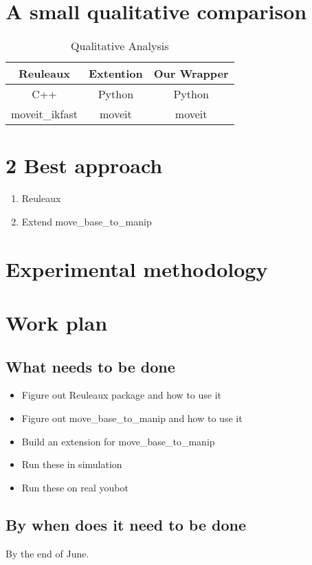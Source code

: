 \documentclass[12pt]{article}
\begin{document}
\section{A small qualitative comparison}
\begin{table}[htpb]
        \centering
        \caption{Qualitative Analysis}
        \label{tab:qualAna}
        \begin{tabular}{|c|c|c|}\hline
                \textbf{Reuleaux} & \textbf{Extention} & \textbf{Our Wrapper}\\\hline
                C++ & Python & Python\\\hline
                moveit\_ikfast & moveit & moveit \\\hline
        \end{tabular}
\end{table}
\section{2 Best approach}
\begin{enumerate}
        \item Reuleaux
        \item Extend move\_base\_to\_manip
\end{enumerate}
\section{Experimental methodology}
\section{Work plan}
\subsection{What needs to be done}
\begin{itemize}
        \item Figure out Reuleaux package and how to use it
        \item Figure out move\_base\_to\_manip and how to use it
        \item Build an extension for move\_base\_to\_manip
        \item Run these in simulation
        \item Run these on real youbot
\end{itemize}
\subsection{By when does it need to be done}
By the end of June.
\end{document}
